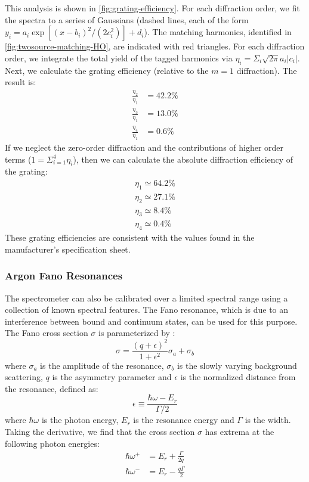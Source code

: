 This analysis is shown in \cref{fig:grating-efficiency}. For each diffraction order, we fit the spectra to a series of Gaussians (dashed lines, each of the form ${y_i = a_i \exp \left[ (x-b_i)^2 / (2 c_i^2) \right] + d_i}$). The matching harmonics, identified in \cref{fig:twosource-matching-HO}, are indicated with red triangles. For each diffraction order, we integrate the total yield of the tagged harmonics via ${\eta_i = \Sigma_i \sqrt{2 \pi} a_i |c_i|}$. Next, we calculate the grating efficiency (relative to the $m=1$ diffraction). The result is:
\begin{align*}
\frac{\eta_2}{\eta_1} &= 42.2 \% \\
\frac{\eta_3}{\eta_1} &= 13.0 \% \\
\frac{\eta_4}{\eta_1} &= 0.6 \%
\end{align*}
If we neglect the zero-order diffraction and the contributions of higher order terms (${1 = \Sigma_{i=1}^4 \eta_i}$), then we can calculate the absolute diffraction efficiency of the grating:
\begin{align*}
\eta_1 \simeq  64.2 \% \\
\eta_2 \simeq 27.1 \% \\
\eta_3 \simeq 8.4 \% \\
\eta_4 \simeq 0.4 \%
\end{align*}
These grating efficiencies are consistent with the values found in the manufacturer's specification sheet.


\subsubsection{Argon Fano Resonances}

The spectrometer can also be calibrated over a limited spectral range using a collection of known spectral features. The Fano resonance, which is due to an interference between bound and continuum states, can be used for this purpose. The Fano cross section $\sigma$ is parameterized by \cite{sorensenArgon3sAutoionization1994,caretteMulticonfigurationalHartreeFockClosecoupling2013}:
\begin{equation}
\sigma = \frac{(q+\epsilon)^2}{1+\epsilon^2} \sigma_a + \sigma_b
\label{eqn:Fano_sigma}
\end{equation}
where $\sigma_a$ is the amplitude of the resonance, $\sigma_b$ is the slowly varying background scattering, $q$ is the asymmetry parameter and $\epsilon$ is the normalized distance from the resonance, defined as:
\begin{equation}
\epsilon \equiv \frac{\hbar \omega - E_r}{\Gamma/2}
\end{equation}
where $\hbar \omega$ is the photon energy, $E_r$ is the resonance energy and $\Gamma$ is the width. Taking the derivative, we find that the cross section $\sigma$ has extrema at the following photon energies:
\begin{align}
\hbar \omega^+ &= E_r + \frac{\Gamma}{2 q} \\
\hbar \omega^- &= E_r - \frac{q \Gamma}{2}
\end{align}

